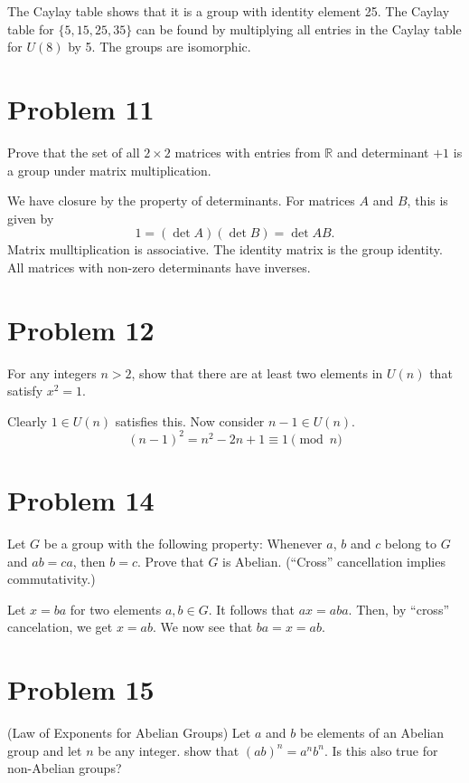 \documentclass[12pt]{article}
\newcommand{\R}{\mathbb{R}}
\begin{document}
The Caylay table shows that it is a group with identity element 25.
The Caylay table for $\{5,15,25,35\}$ can be found by multiplying
all entries in the Caylay table for $U(8)$ by 5.  The groups are isomorphic.

\section*{Problem 11}

Prove that the set of all $2\times 2$ matrices with entries from $\R$ and determinant $+1$
is a group under matrix multiplication.

We have closure by the property of determinants.  For matrices $A$ and $B$, this is given by
\begin{equation*}
1 = (\det A)(\det B) = \det AB.
\end{equation*}
Matrix mulltiplication is associative.  The identity matrix is the group identity.
All matrices with non-zero determinants have inverses.

\section*{Problem 12}

For any integers $n>2$, show that there are at least two elements in $U(n)$
that satisfy $x^2=1$.

Clearly $1\in U(n)$ satisfies this.  Now consider $n-1\in U(n)$.
\begin{equation*}
(n-1)^2 = n^2-2n+1\equiv 1\pmod n
\end{equation*}

\section*{Problem 14}

Let $G$ be a group with the following property: Whenever $a$, $b$ and $c$
belong to $G$ and $ab=ca$, then $b=c$.  Prove that $G$ is Abelian.
(``Cross'' cancellation implies commutativity.)

Let $x=ba$ for two elements $a,b\in G$.  It follows that $ax=aba$.
Then, by ``cross'' cancelation, we get $x=ab$.  We now see
that $ba=x=ab$.

\section*{Problem 15}

(Law of Exponents for Abelian Groups)  Let $a$ and $b$ be elements of an
Abelian group and let $n$ be any integer.  show that $(ab)^n=a^nb^n$.
Is this also true for non-Abelian groups?
\end{document}
